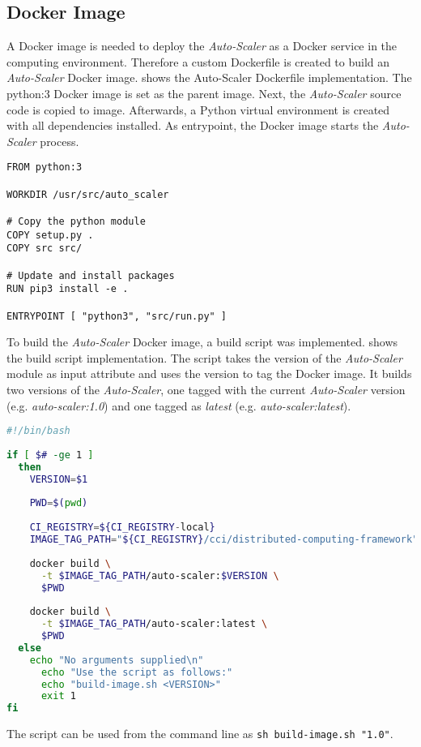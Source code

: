 \subsection{Docker Image}
A Docker image is needed to deploy the \textit{Auto-Scaler} as a Docker service in the computing environment. Therefore a custom Dockerfile is created to build an \textit{Auto-Scaler} Docker image.
 shows the Auto-Scaler Dockerfile implementation. The python:3 Docker image is set as the parent image. 
Next, the \textit{Auto-Scaler} source code is copied to image. Afterwards, a Python virtual environment is created with all dependencies installed.
As entrypoint, the Docker image starts the \textit{Auto-Scaler} process.
\begin{lstlisting}[label=lst:06_auto-scaler_dockerfile, caption=Auto-Scaler Dockerfile]
FROM python:3
 
WORKDIR /usr/src/auto_scaler
 
# Copy the python module
COPY setup.py .
COPY src src/
 
# Update and install packages
RUN pip3 install -e .
 
ENTRYPOINT [ "python3", "src/run.py" ]
\end{lstlisting}


To build the \textit{Auto-Scaler} Docker image, a build script was implemented.  shows the build script implementation.
The script takes the version of the \textit{Auto-Scaler} module as input attribute and uses the version to tag the Docker image.
It builds two versions of the \textit{Auto-Scaler}, one tagged with the current \textit{Auto-Scaler} version (e.g. \textit{auto-scaler:1.0}) and one tagged as \textit{latest} (e.g. \textit{auto-scaler:latest}).
\begin{lstlisting}[label=lst:06_auto-scaler_build, caption=Auto-Scaler build script, language=sh]
#!/bin/bash
 
if [ $# -ge 1 ]
  then
    VERSION=$1
 
    PWD=$(pwd)
 
    CI_REGISTRY=${CI_REGISTRY-local}
    IMAGE_TAG_PATH="${CI_REGISTRY}/cci/distributed-computing-framework"
 
    docker build \
      -t $IMAGE_TAG_PATH/auto-scaler:$VERSION \
      $PWD
 
    docker build \
      -t $IMAGE_TAG_PATH/auto-scaler:latest \
      $PWD
  else
    echo "No arguments supplied\n"
      echo "Use the script as follows:"
      echo "build-image.sh <VERSION>"
      exit 1
fi
\end{lstlisting}
The script can be used from the command line as \texttt{sh build-image.sh "1.0"}.


